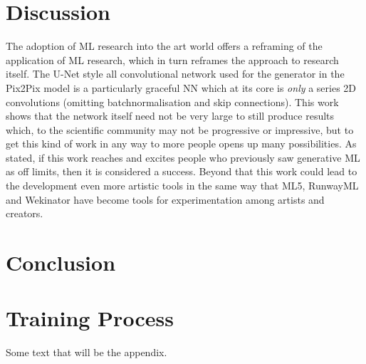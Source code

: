 \documentclass{article}
\begin{document}
\section{Discussion}
The adoption of ML research into the art world offers a reframing of the application of ML research, which in turn reframes the approach to research itself. The U-Net style all convolutional network used for the generator in the Pix2Pix model is a particularly graceful NN which at its core is \textit{only} a series 2D convolutions (omitting batchnormalisation and skip connections). This work shows that the network itself need not be very large to still produce results which, to the scientific community may not be progressive or impressive, but to get this kind of work in any way to more people opens up many possibilities. As stated, if this work reaches and excites people who previously saw generative ML as off limits, then it is considered a success. Beyond that this work could lead to the development even more artistic tools in the same way that ML5\cite{ml5}, RunwayML\cite{runway} and Wekinator\cite{wekinator} have become tools for experimentation among artists and creators.


\section{Conclusion}



\medskip
\printbibliography

\appendix
\section{Training Process}
Some text that will be the appendix.
\end{document}

